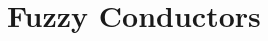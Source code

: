 \documentclass[11pt]{article}
\newcommand{\lemref}[1]{\mbox{Lemma~\ref{#1}}}
\newcommand{\poly}{\ensuremath{\mathtt{poly}}\xspace}
\newcommand{\Hfuzz}{\mathrm{H}^{\mathtt{fuzz}}_{t,\infty}}
\newcommand{\Huse}{\mathrm{H}_{\mathtt{usable}}}
\begin{document}
%

\section{Fuzzy Conductors}
\end{document}
